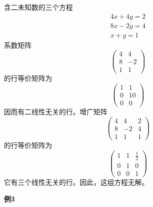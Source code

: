 含二未知数的三个方程
\[
\begin{array}{c}
    4x+4y=2 \\ 8x-2y=4 \\ x+y=1
\end{array}
\]
系数矩阵
\[
\begin{pmatrix}
    4 & 4 \\
    8 & -2 \\
    1 & 1
\end{pmatrix}    
\]
的行等价矩阵为
\[
\begin{pmatrix}
    1 & 1 \\
    0 & 10 \\
    0 & 0
\end{pmatrix}    
\]
因而有二线性无关的行。增广矩阵
\[
\begin{pmatrix}
    4 & 4 & 2 \\
    8 & -2 & 4 \\
    1 & 1 & 1
\end{pmatrix}    
\]
的行等价矩阵为
\[
\begin{pmatrix}
    1 & 1 & \frac{1}{2} \\
    0 & 1 & 0 \\
    0 & 0 & 1
\end{pmatrix}    
\]
它有三个线性无关的行。因此，这组方程无解。

\textbf{例3}

